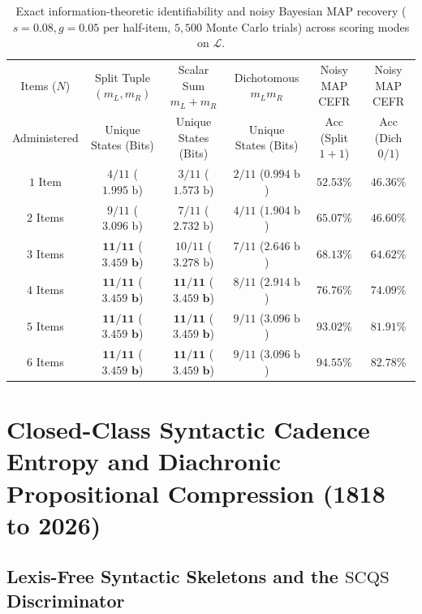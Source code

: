 \documentclass[11pt,reqno]{article}
\begin{document}
\begin{table}[ht]
\centering
\caption{Exact information-theoretic identifiability and noisy Bayesian MAP recovery ($s=0.08, g=0.05$ per half-item, $5,500$ Monte Carlo trials) across scoring modes on $\mathcal{L}$.}\label{tab:psychometrics}
\smallskip
\begin{tabular}{@{}cccccc@{}}
\toprule
Items ($N$) & Split Tuple $(m_L, m_R)$ & Scalar Sum $m_L+m_R$ & Dichotomous $m_L m_R$ & Noisy MAP CEFR & Noisy MAP CEFR \\
Administered & Unique States (Bits) & Unique States (Bits) & Unique States (Bits) & Acc (Split $1+1$) & Acc (Dich $0/1$) \\
\midrule
$1$ Item & $4 / 11$ ($1.995\text{ b}$) & $3 / 11$ ($1.573\text{ b}$) & $2 / 11$ ($0.994\text{ b}$) & $52.53\%$ & $46.36\%$ \\
$2$ Items & $9 / 11$ ($3.096\text{ b}$) & $7 / 11$ ($2.732\text{ b}$) & $4 / 11$ ($1.904\text{ b}$) & $65.07\%$ & $46.60\%$ \\
$3$ Items & $\mathbf{11 / 11}$ ($\mathbf{3.459\text{ b}}$) & $10 / 11$ ($3.278\text{ b}$) & $7 / 11$ ($2.646\text{ b}$) & $68.13\%$ & $64.62\%$ \\
$4$ Items & $\mathbf{11 / 11}$ ($\mathbf{3.459\text{ b}}$) & $\mathbf{11 / 11}$ ($\mathbf{3.459\text{ b}}$) & $8 / 11$ ($2.914\text{ b}$) & $76.76\%$ & $74.09\%$ \\
$5$ Items & $\mathbf{11 / 11}$ ($\mathbf{3.459\text{ b}}$) & $\mathbf{11 / 11}$ ($\mathbf{3.459\text{ b}}$) & $9 / 11$ ($3.096\text{ b}$) & $93.02\%$ & $81.91\%$ \\
$6$ Items & $\mathbf{11 / 11}$ ($\mathbf{3.459\text{ b}}$) & $\mathbf{11 / 11}$ ($\mathbf{3.459\text{ b}}$) & $9 / 11$ ($3.096\text{ b}$) & $\mathbf{94.55\%}$ & $82.78\%$ \\
\bottomrule
\end{tabular}
\end{table}

\section{Closed-Class Syntactic Cadence Entropy and Diachronic Propositional Compression (1818 to 2026)}\label{sec:stylometry}

\subsection{Lexis-Free Syntactic Skeletons and the $\mathrm{SCQS}$ Discriminator}
\end{document}
